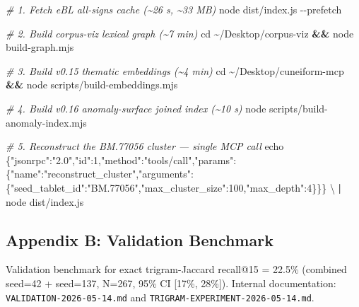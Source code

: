 \documentclass[
  11pt,
  letterpaper,
]{article}
\newenvironment{Shaded}{}{}
\newcommand{\AttributeTok}[1]{\textcolor[rgb]{0.49,0.56,0.16}{#1}}
\newcommand{\BuiltInTok}[1]{\textcolor[rgb]{0.00,0.50,0.00}{#1}}
\newcommand{\CommentTok}[1]{\textcolor[rgb]{0.38,0.63,0.69}{\textit{#1}}}
\newcommand{\DataTypeTok}[1]{\textcolor[rgb]{0.56,0.13,0.00}{#1}}
\newcommand{\ExtensionTok}[1]{#1}
\newcommand{\KeywordTok}[1]{\textcolor[rgb]{0.00,0.44,0.13}{\textbf{#1}}}
\newcommand{\NormalTok}[1]{#1}
\newcommand{\StringTok}[1]{\textcolor[rgb]{0.25,0.44,0.63}{#1}}
\begin{document}
\begin{Shaded}
\begin{Highlighting}[]
\CommentTok{\# 1. Fetch eBL all{-}signs cache (\textasciitilde{}26 s, \textasciitilde{}33 MB)}
\ExtensionTok{node}\NormalTok{ dist/index.js }\AttributeTok{{-}{-}prefetch}

\CommentTok{\# 2. Build corpus{-}viz lexical graph (\textasciitilde{}7 min)}
\BuiltInTok{cd}\NormalTok{ \textasciitilde{}/Desktop/corpus{-}viz }\KeywordTok{\&\&} \ExtensionTok{node}\NormalTok{ build{-}graph.mjs}

\CommentTok{\# 3. Build v0.15 thematic embeddings (\textasciitilde{}4 min)}
\BuiltInTok{cd}\NormalTok{ \textasciitilde{}/Desktop/cuneiform{-}mcp }\KeywordTok{\&\&} \ExtensionTok{node}\NormalTok{ scripts/build{-}embeddings.mjs}

\CommentTok{\# 4. Build v0.16 anomaly{-}surface joined index (\textasciitilde{}10 s)}
\ExtensionTok{node}\NormalTok{ scripts/build{-}anomaly{-}index.mjs}

\CommentTok{\# 5. Reconstruct the BM.77056 cluster — single MCP call}
\BuiltInTok{echo} \StringTok{\textquotesingle{}\{"jsonrpc":"2.0","id":1,"method":"tools/call","params":\{"name":"reconstruct\_cluster","arguments":\{"seed\_tablet\_id":"BM.77056","max\_cluster\_size":100,"max\_depth":4\}\}\}\textquotesingle{}} \DataTypeTok{\textbackslash{}}
  \KeywordTok{|} \ExtensionTok{node}\NormalTok{ dist/index.js}
\end{Highlighting}
\end{Shaded}

\subsection{Appendix B: Validation
Benchmark}\label{appendix-b-validation-benchmark}

Validation benchmark for exact trigram-Jaccard recall@15 = 22.5\%
(combined seed=42 + seed=137, N=267, 95\% CI {[}17\%, 28\%{]}). Internal
documentation: \texttt{VALIDATION-2026-05-14.md} and
\texttt{TRIGRAM-EXPERIMENT-2026-05-14.md}.
\end{document}
